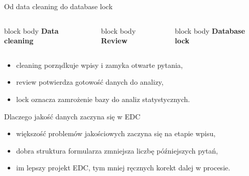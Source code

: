 \begin{frame}{Od data cleaning do database lock}
  \begin{columns}[T,onlytextwidth]
    \begin{beamercolorbox}[wd=\linewidth,sep=0.7em,rounded=true]{block body}
      \centering
      \textbf{Data cleaning}
    \end{beamercolorbox}

    \begin{beamercolorbox}[wd=\linewidth,sep=0.7em,rounded=true]{block body}
      \centering
      \textbf{Review}
    \end{beamercolorbox}

    \begin{beamercolorbox}[wd=\linewidth,sep=0.7em,rounded=true]{block body}
      \centering
      \textbf{Database lock}
    \end{beamercolorbox}
  \end{columns}

  \vspace{0.45cm}

  \begin{itemize}
    \item cleaning porządkuje wpisy i zamyka otwarte pytania,
    \item review potwierdza gotowość danych do analizy,
    \item lock oznacza zamrożenie bazy do analiz statystycznych.
  \end{itemize}
\end{frame}


\begin{frame}{Dlaczego jakość danych zaczyna się w EDC}
  \begin{itemize}
    \item większość problemów jakościowych zaczyna się na etapie wpisu,
    \item dobra struktura formularza zmniejsza liczbę późniejszych pytań,
    \item im lepszy projekt EDC, tym mniej ręcznych korekt dalej w procesie.
  \end{itemize}
\end{frame}

